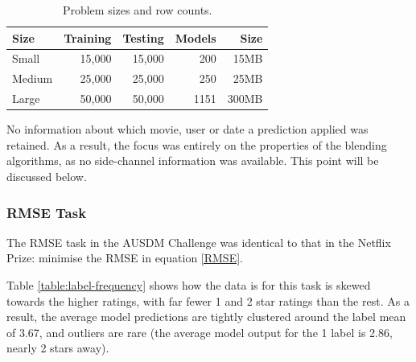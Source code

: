 \documentclass{article}
\begin{document}
\begin{table}[t]
\caption{Problem sizes and row counts.}
\label{problems}
\vskip 0.15in
\begin{center}
\begin{small}
\begin{sc}
\begin{tabular}{lrrrr}
\hline
\abovespace\belowspace
Size & Training & Testing & Models & Size \\
\hline
\abovespace
Small    & 15,000 & 15,000 & 200 &   15MB \\
Medium   & 25,000 & 25,000 & 250 &   25MB \\
\belowspace
Large    & 50,000 & 50,000 & 1151 & 300MB \\
\hline
\end{tabular}
\end{sc}
\end{small}
\end{center}
\vskip -0.1in
\end{table}

No information about which movie, user or date a prediction applied was retained.  As a result, the focus was entirely on the properties of the blending algorithms, as no side-channel information was available.  This point will be discussed below.

\subsubsection{RMSE Task}

The RMSE task in the AUSDM Challenge was identical to that in the Netflix Prize: minimise the RMSE in equation \ref{RMSE}.

Table \ref{table:label-frequency} shows how the data is for this task is skewed towards the higher ratings, with far fewer 1 and 2 star ratings than the rest.
As a result, the average model predictions are tightly clustered around the label mean of 3.67, and outliers are rare (the average model output for the 1 label is 2.86, nearly 2 stars away).
\end{document}
